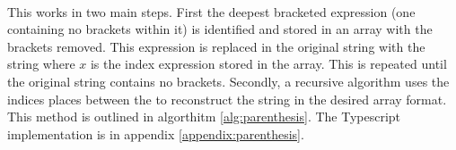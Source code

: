 \paragraph{} This works in two main steps. First the deepest bracketed expression (one containing no brackets within it) is identified and stored in an array with the brackets removed. This expression is replaced in the original string with the string  where $x$ is the index expression stored in the array. This is repeated until the original string contains no brackets. Secondly, a recursive algorithm uses the indices places between the \texttt{\upquote{\_\_\_}} to reconstruct the string in the desired array format. This method is outlined in algorthitm \ref{alg:parenthesis}. The Typescript implementation is in appendix \ref{appendix:parenthesis}.

